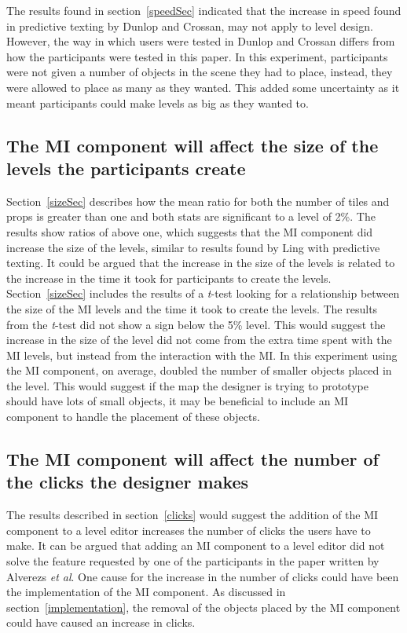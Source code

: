 \documentclass[journal]{IEEEtran}
\begin{document}
The results found in section~\ref{speedSec} indicated that the increase in speed found in predictive texting by Dunlop and Crossan\cite{dunlop2000predictive}, may not apply to level design. However, the way in which users were tested in Dunlop and Crossan\cite{dunlop2000predictive} differs from how the participants were tested in this paper. In this experiment, participants were not given a number of objects in the scene they had to place, instead, they were allowed to place as many as they wanted. This added some uncertainty as it meant participants could make levels as big as they wanted to. 

\subsection{The MI component will affect the size of the levels the participants create}
Section~\ref{sizeSec} describes how the mean ratio for both the number of tiles and props is greater than one and both stats are significant to a level of 2\%.  The results show ratios of above one, which suggests that the MI component did increase the size of the levels, similar to results found by Ling \cite{ling2005length} with predictive texting. It could be argued that the increase in the size of the levels is related to the increase in the time it took for participants to create the levels. Section~\ref{sizeSec} includes the results of a \textit{t}-test looking for a relationship between the size of the MI levels and the time it took to create the levels. The results from the \textit{t}-test did not show a sign below the 5\% level. This would suggest the increase in the size of the level did not come from the extra time spent with the MI levels, but instead from the interaction with the MI. In this experiment using the MI component, on average, doubled the number of smaller objects placed in the level. This would suggest if the map the designer is trying to prototype should have lots of small objects, it may be beneficial to include an MI component to handle the placement of these objects. 

\subsection{The MI component will affect the number of the clicks the designer makes}
The results described in section~\ref{clicks} would suggest the addition of the MI component to a level editor increases the number of clicks the users have to make. It can be argued that adding an MI component to a level editor did not solve the feature requested by one of the participants in the paper written by Alverezs \textit{et al}\cite{alvarez2018fostering}. One cause for the increase in the number of clicks could have been the implementation of the MI component. As discussed in section~\ref{implementation}, the removal of the objects placed by the MI component could have caused an increase in clicks. 
\end{document}
